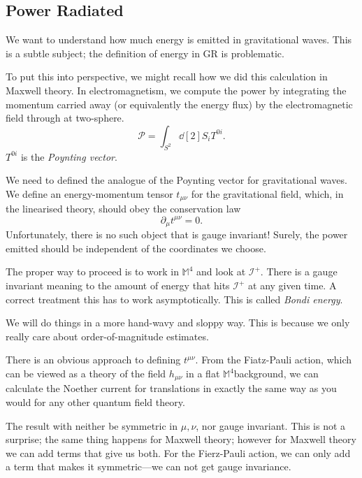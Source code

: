 
\subsection{Power Radiated}%
\label{sub:power_radiated}

We want to understand how much energy is emitted in gravitational waves.
This is a subtle subject; the definition of energy in GR is problematic.

To put this into perspective, we might recall how we did this calculation in Maxwell theory.
In electromagnetism, we compute the power by integrating the momentum carried away (or equivalently the energy flux) by the electromagnetic field through at two-sphere.
\begin{equation}
  \mathcal{P} = \int_{S^2} \dd[2]{S_i} T^{0i}.
\end{equation}
$T^{0i}$ is the \emph{Poynting vector}.

We need to defined the analogue of the Poynting vector for gravitational waves.
We define an energy-momentum tensor $t_{\mu\nu}$ for the gravitational field, which, in the linearised theory, should obey the conservation law
\begin{equation}
  \partial_{\mu} t^{\mu\nu} = 0.
\end{equation}
Unfortunately, there is no such object that is gauge invariant!
Surely, the power emitted should be independent of the coordinates we choose.

The proper way to proceed is to work in $\mathbb{M}^4$ and look at $\mathscr{I}^+$. There is a gauge invariant meaning to the amount of energy that hits $\mathscr{I}^+$ at any given time.
A correct treatment this has to work asymptotically. This is called \emph{Bondi energy}.

We will do things in a more hand-wavy and sloppy way.
This is because we only really care about order-of-magnitude estimates.

There is an obvious approach to defining $t^{\mu\nu}$. From the Fiatz-Pauli action, which can be viewed as a theory of the field $h_{\mu\nu}$ in a flat $\mathbb{M}^4$background, we can calculate the Noether current for translations in exactly the same way as you would for any other quantum field theory.

The result with neither be symmetric in $\mu, \nu$, nor gauge invariant.
This is not a surprise; the same thing happens for Maxwell theory; however for Maxwell theory we can add terms that give us both. For the Fierz-Pauli action, we can only add a term that makes it symmetric---we can not get gauge invariance.

